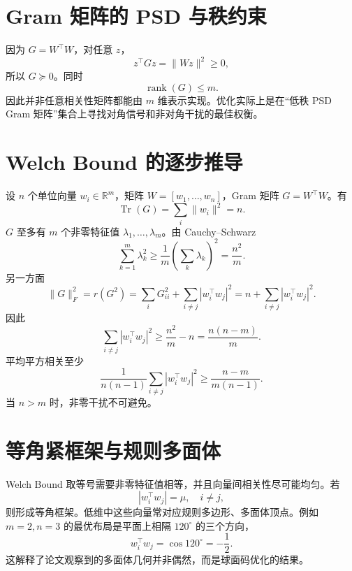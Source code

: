 \documentclass[UTF8,12pt,a4paper,fontset=none]{ctexart}
\numberwithin{equation}{section}
\newcommand{\R}{\mathbb{R}}
\newcommand{\tr}{\operatorname{Tr}}
\newcommand{\rank}{\operatorname{rank}}
\begin{document}
\section{Gram 矩阵的 PSD 与秩约束}
因为 $G=W^\top W$，对任意 $z$，
\begin{equation}
 z^\top Gz=\|Wz\|^2\ge0,
\end{equation}
所以 $G\succeq0$。同时
\begin{equation}
 \rank(G)\le m.
\end{equation}
因此并非任意相关性矩阵都能由 $m$ 维表示实现。优化实际上是在“低秩 PSD Gram 矩阵”集合上寻找对角信号和非对角干扰的最佳权衡。

\section{Welch Bound 的逐步推导}
设 $n$ 个单位向量 $w_i\in\R^m$，矩阵 $W=[w_1,\ldots,w_n]$，Gram 矩阵 $G=W^\top W$。有
\begin{equation}
 \tr(G)=\sum_i\|w_i\|^2=n.
\end{equation}
$G$ 至多有 $m$ 个非零特征值 $\lambda_1,\ldots,\lambda_m$。由 Cauchy--Schwarz
\begin{equation}
 \sum_{k=1}^{m}\lambda_k^2
 \ge\frac1m\left(\sum_k\lambda_k\right)^2
 =\frac{n^2}{m}.
\end{equation}
另一方面
\begin{equation}
 \|G\|_F^2=	r(G^2)
 =\sum_iG_{ii}^2+
 \sum_{i\ne j}|w_i^\top w_j|^2
 =n+
 \sum_{i\ne j}|w_i^\top w_j|^2.
\end{equation}
因此
\begin{equation}
 \sum_{i\ne j}|w_i^\top w_j|^2
 \ge\frac{n^2}{m}-n
 =\frac{n(n-m)}{m}.
\end{equation}
平均平方相关至少
\begin{equation}
 \frac1{n(n-1)}\sum_{i\ne j}|w_i^\top w_j|^2
 \ge\frac{n-m}{m(n-1)}.
\end{equation}
当 $n>m$ 时，非零干扰不可避免。

\section{等角紧框架与规则多面体}
Welch Bound 取等号需要非零特征值相等，并且向量间相关性尽可能均匀。若
\begin{equation}
 |w_i^\top w_j|=\mu,\quad i\ne j,
\end{equation}
则形成等角框架。低维中这些向量常对应规则多边形、多面体顶点。例如 $m=2,n=3$ 的最优布局是平面上相隔 $120^\circ$ 的三个方向，
\begin{equation}
 w_i^\top w_j=\cos120^\circ=-\frac12.
\end{equation}
这解释了论文观察到的多面体几何并非偶然，而是球面码优化的结果。
\end{document}
